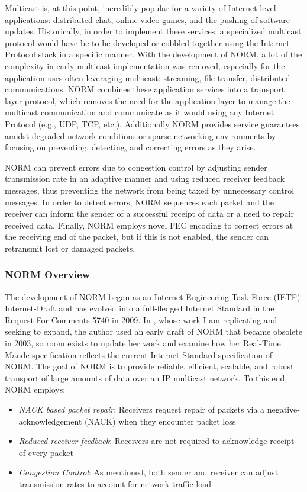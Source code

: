 \documentclass[10pt, journal]{IEEEtran}
\begin{document}
Multicast is, at this point, incredibly popular for a variety of Internet level applications: distributed chat, online video games, and the pushing of software updates. Historically, in order to implement these services, a specialized multicast protocol would have be to be developed or cobbled together using the Internet Protocol stack in a specific manner. With the development of NORM, a lot of the complexity in early multicast implementation was removed, especially for the application uses often leveraging multicast: streaming, file transfer, distributed communications. NORM \cite{rfc5740} combines these application services into a transport layer protocol, which removes the need for the application layer to manage the multicast communication and communicate as it would using any Internet Protocol (e.g., UDP, TCP, etc.). Additionally NORM provides service guarantees amidst degraded network conditions or sparse networking environments by focusing on preventing, detecting, and correcting errors as they arise.

NORM can prevent errors due to congestion control by adjusting sender transmission rate in an adaptive manner and using reduced receiver feedback messages, thus preventing the network from being taxed by unnecessary control messages. In order to detect errors, NORM sequences each packet and the receiver can inform the sender of a successful receipt of data or a need to repair received data. Finally, NORM employs novel FEC encoding to correct errors at the receiving end of the packet, but if this is not enabled, the sender can retransmit lost or damaged packets.

\subsubsection{NORM Overview}
The development of NORM began as an Internet Engineering Task Force (IETF) Internet-Draft and has evolved into a full-fledged Internet Standard in the Request For Comments 5740 \cite{rfc5740} in 2009. In \cite{Lien2004}, whose work I am replicating and seeking to expand, the author used an early draft of NORM that became obsolete in 2003, so room exists to update her work and examine how her Real-Time Maude specification reflects the current Internet Standard specification of NORM. The goal of NORM is to provide reliable, efficient, scalable, and robust transport of large amounts of data over an IP multicast network. To this end, NORM employs:
\begin{itemize}
	\item \textit{NACK based packet repair}: Receivers request repair of packets via a negative-acknowledgement (NACK) when they encounter packet loss
	\item \textit{Reduced receiver feedback}: Receivers are not required to acknowledge receipt of every packet
	\item \textit{Congestion Control}: As mentioned, both sender and receiver can adjust transmission rates to account for network traffic load
\end{itemize}
\end{document}
